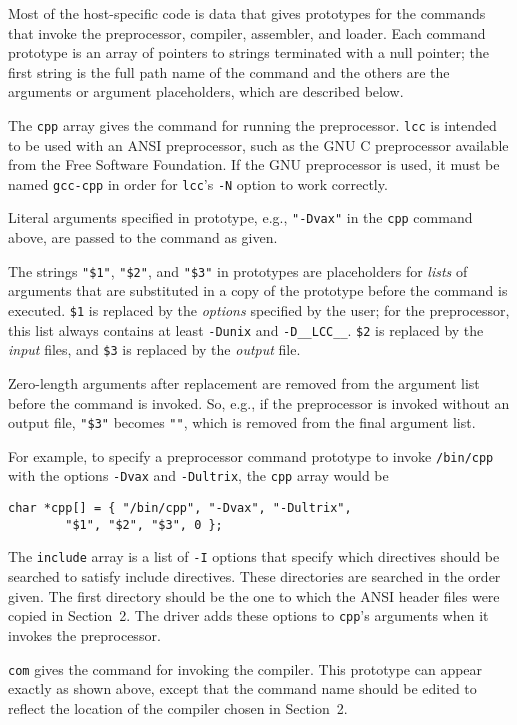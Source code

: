 Most of the host-specific code is data that
gives prototypes for the commands that invoke
the preprocessor, compiler, assembler, and loader.
Each command prototype is an array of pointers to strings
terminated with a null pointer;
the first string is the full path name of the command and the others
are the arguments or argument placeholders, which are described below.

The \verb|cpp| array gives the command for running the preprocessor.
\verb|lcc| is intended to be used with an ANSI preprocessor,
such as the GNU C preprocessor available from the Free Software Foundation.
If the GNU preprocessor is used,
it must be named \verb|gcc-cpp| in order for \verb|lcc|'s \verb|-N| option
to work correctly.

Literal arguments specified in prototype, e.g., \verb|"-Dvax"| in
the \verb|cpp| command above, are passed to the command as given.

The strings \verb|"$1"|, \verb|"$2"|, and \verb|"$3"| in
prototypes are placeholders for {\em lists} of arguments that
are substituted in a copy of the prototype before the command is executed.
\verb|$1| is replaced by the {\em options} specified by the user;
for the preprocessor, this list always contains at least
\verb|-Dunix| and \verb|-D__LCC__|.
\verb|$2| is replaced by the {\em input} files,
and \verb|$3| is replaced by the {\em output} file.

Zero-length arguments after replacement are removed from
the argument list before the command is invoked. So, e.g.,
if the preprocessor is invoked without an output file,
\verb|"$3"| becomes \verb|""|, which is removed from the final argument list.

For example, to specify a preprocessor command prototype to invoke
\verb|/bin/cpp| with the options \verb|-Dvax| and \verb|-Dultrix|,
the \verb|cpp| array would be
\begin{verbatim}
char *cpp[] = { "/bin/cpp", "-Dvax", "-Dultrix",
        "$1", "$2", "$3", 0 };
\end{verbatim}

The \verb|include| array is a list of \verb|-I| options that
specify which directives should be searched to satisfy include directives.
These directories are searched in the order given.
The first directory should be the one to which the ANSI
header files were copied in Section~2.
The driver adds these options to \verb|cpp|'s arguments
when it invokes the preprocessor.

\verb|com| gives the command for invoking the compiler.
This prototype can appear exactly as shown above, except
that the command name should be edited to reflect the
location of the compiler chosen in Section~2.

